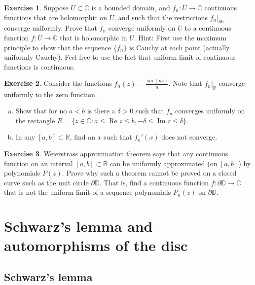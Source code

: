 \documentclass[12pt,openany]{book}
\renewcommand{\Re}{\operatorname{Re}}
\renewcommand{\Im}{\operatorname{Im}}
\newcommand{\C}{{\mathbb{C}}}
\newcommand{\R}{{\mathbb{R}}}
\newcommand{\D}{{\mathbb{D}}}
\theoremstyle{plain}
\theoremstyle{remark}
\theoremstyle{definition}
\newenvironment{exbox}{%
    \def\FrameCommand{\vrule width 1pt \relax\hspace{10pt}}%
    \MakeFramed{\advance\hsize-\width\FrameRestore}%
}{%
    \endMakeFramed
}
\newenvironment{exparts}{%
    \leavevmode\begin{enumerate}[a),noitemsep,topsep=0pt,parsep=0pt,partopsep=0pt]
}{%
    \end{enumerate}
}
\theoremstyle{exercise}
\newtheorem{exercise}{Exercise}[section]
\theoremstyle{example}
\begin{document}
\begin{exbox}
\begin{exercise}
Suppose $U \subset \C$ is a bounded domain, and $f_n \colon \overline{U} \to
\C$ continuous functions that are holomorphic on $U$, and such that
the restrictions $f_n|_{\partial U}$ converge uniformly.  Prove that
$f_n$ converge uniformly on $\overline{U}$ to a continuous
function $f \colon \overline{U} \to \C$ that is holomorphic in $U$.
Hint: First use the maximum principle to show that the sequence
$\{ f_n \}$
is Cauchy at each point (actually uniformly Cauchy).  Feel free to use the
fact that uniform limit of continuous functions is continuous.
\end{exercise}

\begin{exercise}
Consider the functions $f_n(z) = \frac{\sin(nz)}{n}$.  Note that $f_n|_{\R}$ converge
uniformly to the zero function.
\begin{exparts}
\item
Show that for no $a < b$ is there a $\delta > 0$ such that
$f_n$ converges uniformly on the rectangle $R = \bigl\{ z \in \C : a \leq \Re z
\leq b , -\delta \leq \Im z \leq \delta \bigr\}$.
\item
In any $[a,b] \subset \R$, find 
an $x$ such that $f_n'(x)$ does not converge.
\end{exparts}
\end{exercise}

\begin{exercise}
\pagebreak[2]
Weierstrass approximation theorem says that any continuous function on an
interval $[a,b] \subset \R$ can be uniformly approximated (on $[a,b]$) by
polynomials $P(z)$.  Prove why such a theorem cannot be proved
on a closed curve such as the unit circle $\partial \D$.  That is,
find a continuous function $f \colon \partial \D \to \C$ that is
not the uniform limit of a sequence polynomials $P_n(z)$ on $\partial \D$.
\end{exercise}
\end{exbox}


\section{Schwarz's lemma and automorphisms of the disc}
\label{sec:schwarz}

\subsection{Schwarz's lemma}
\end{document}
